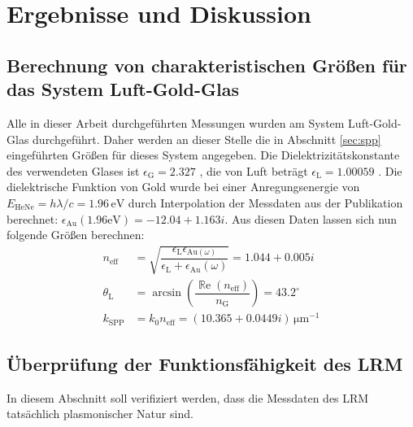 \documentclass[a4paper, titlepage,  ngerman, fullpage]{book}
\renewcommand{\Re}{\operatorname{\mathbb{R}e}}
\begin{document}
	\chapter{Ergebnisse und Diskussion}
	\section{Berechnung von charakteristischen Größen für das System Luft-Gold-Glas}
		Alle in dieser Arbeit durchgeführten Messungen wurden am System Luft-Gold-Glas durchgeführt. Daher werden an dieser Stelle die in Abschnitt \ref{sec:spp} eingeführten Größen für dieses System angegeben. Die Dielektrizitätskonstante des verwendeten Glases ist $\epsilon_{\mathrm{G}} = 2.327$ \cite{Zeiss.}, die von Luft beträgt $\epsilon_{\mathrm{L}} = 1.00059$ \cite{Hippel.1995}. Die dielektrische Funktion von Gold wurde bei einer Anregungsenergie von $E_{\mathrm{HeNe}} = h\lambda/c = 1.96\,\mathrm{eV} $ durch Interpolation der Messdaten aus der Publikation \cite{Olmon.2012} berechnet: $\epsilon_{\mathrm{Au}}(1.96\mathrm{eV}) = -12.04 +1.163i$. Aus diesen Daten lassen sich nun folgende Größen berechnen:
		\begin{subequations}
			\begin{align}
				n_{\mathrm{eff}} &= \sqrt{\dfrac{\epsilon_{\mathrm{L}}\epsilon_{\mathrm{Au}(\omega)}}{\epsilon_{\mathrm{L}} + 	\epsilon_{\mathrm{Au}}(\omega)}} = 	1.044 + 0.005i \label{eq:theo_n_eff}\\			
				\theta_\mathrm{L} &=  \arcsin\left(\dfrac{\Re(n_{\mathrm{eff}})}{ n_\mathrm{G}}\right) = 43.2^\circ 
				\label{eq:theo_theta_l}\\
				k_{\mathrm{SPP}} &= k_0 n_{\mathrm{eff}} = (10.365 + 0.0449i)\,\mathrm{\mu m}^{-1}\label{eq:theo_k_spp}
			\end{align}
		\end{subequations}
	
	\section{Überprüfung der Funktionsfähigkeit des LRM}
	In diesem Abschnitt soll verifiziert werden, dass die Messdaten des LRM tatsächlich plasmonischer Natur sind.
\end{document}
